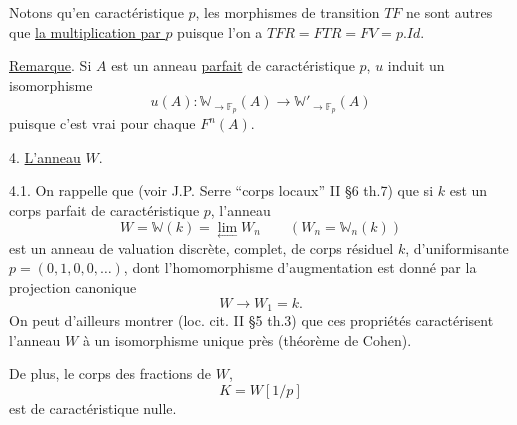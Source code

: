Notons qu'en caractéristique $p$, les morphismes de transition $TF$ ne
sont autres que \uline{la multiplication par $p$} puisque l'on a $TFR = FTR = FV = p.Id$.

\uline{Remarque}. Si $A$ est un anneau \uline{parfait} de caractéristique $p$, $u$ induit
un isomorphisme
\[ u(A) : \mathbb{W}_{\to\mathbb{F}_p}(A) \to \mathbb{W}'_{\to\mathbb{F}_p}(A) \]
puisque c'est vrai pour chaque $F^n(A)$.

4. \uline{L'anneau} $W$.

4.1. On rappelle que (voir J.P. Serre ``corps locaux'' II §6 th.7)
que si $k$ est un corps parfait de caractéristique $p$, l'anneau
\[ W = \mathbb{W}(k) = \lim_{\leftarrow} W_n \qquad (W_n = \mathbb{W}_n(k)) \]
est un anneau de valuation discrète, complet, de corps résiduel $k$,
d'uniformisante $p = (0,1,0,0,\ldots)$, dont l'homomorphisme d'augmentation
est donné par la projection canonique
\[ W \to W_1 = k . \]
On peut d'ailleurs montrer (loc. cit. II §5 th.3) que ces propriétés
caractérisent l'anneau $W$ à un isomorphisme unique près (théorème de
Cohen).

De plus, le corps des fractions de $W$,
\[ K = W[1/p] \]
est de caractéristique nulle.

